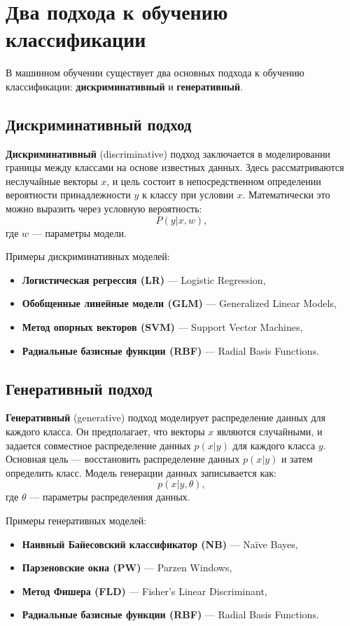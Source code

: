 \section{Два подхода к обучению классификации}
В машинном обучении существует два основных подхода к обучению классификации: \textbf{дискриминативный} и \textbf{генеративный}.

\subsection{Дискриминативный подход}
\textbf{Дискриминативный} (discriminative) подход заключается в моделировании границы между классами на основе известных данных. Здесь рассматриваются неслучайные векторы $x$, и цель состоит в непосредственном определении вероятности принадлежности $y$ к классу при условии $x$. Математически это можно выразить через условную вероятность:
\begin{equation}
    P(y | x, w),
\end{equation}
где $w$ — параметры модели.

\noindent Примеры дискриминативных моделей:
\begin{itemize}
    \item \textbf{Логистическая регрессия (LR)} — Logistic Regression,
    \item \textbf{Обобщенные линейные модели (GLM)} — Generalized Linear Models,
    \item \textbf{Метод опорных векторов (SVM)} — Support Vector Machines,
    \item \textbf{Радиальные базисные функции (RBF)} — Radial Basis Functions.
\end{itemize}

\subsection{Генеративный подход}
\textbf{Генеративный} (generative) подход моделирует распределение данных для каждого класса. Он предполагает, что векторы $x$ являются случайными, и задается совместное распределение данных $p(x|y)$ для каждого класса $y$. Основная цель — восстановить распределение данных $p(x|y)$ и затем определить класс. Модель генерации данных записывается как:
\begin{equation}
    p(x | y, \theta),
\end{equation}
где $\theta$ — параметры распределения данных.

\noindent Примеры генеративных моделей:
\begin{itemize}
    \item \textbf{Наивный Байесовский классификатор (NB)} — Na\"ive Bayes,
    \item \textbf{Парзеновские окна (PW)} — Parzen Windows,
    \item \textbf{Метод Фишера (FLD)} — Fisher's Linear Discriminant,
    \item \textbf{Радиальные базисные функции (RBF)} — Radial Basis Functions.
\end{itemize}

